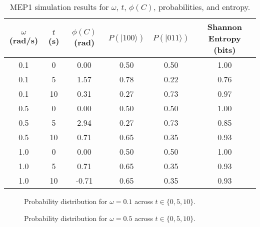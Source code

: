 \documentclass[a4paper,12pt]{article}
\begin{document}
\begin{table}[h]
\centering
\caption{MEP1 simulation results for $\omega$, $t$, $\phi(C)$, probabilities, and entropy.}
\label{tab:results}
\begin{tabular}{cccccc}
\toprule
$\omega$ (rad/s) & $t$ (s) & $\phi(C)$ (rad) & $P(|100\rangle)$ & $P(|011\rangle)$ & Shannon Entropy (bits) \\
\midrule
0.1 & 0 & 0.00 & 0.50 & 0.50 & 1.00 \\
0.1 & 5 & 1.57 & 0.78 & 0.22 & 0.76 \\
0.1 & 10 & 0.31 & 0.27 & 0.73 & 0.97 \\
0.5 & 0 & 0.00 & 0.50 & 0.50 & 1.00 \\
0.5 & 5 & 2.94 & 0.27 & 0.73 & 0.85 \\
0.5 & 10 & 0.71 & 0.65 & 0.35 & 0.93 \\
1.0 & 0 & 0.00 & 0.50 & 0.50 & 1.00 \\
1.0 & 5 & 0.71 & 0.65 & 0.35 & 0.93 \\
1.0 & 10 & -0.71 & 0.65 & 0.35 & 0.93 \\
\bottomrule
\end{tabular}
\end{table}

\begin{figure}[h]
\centering
{}
\caption{Probability distribution for $\omega = 0.1$ across $t \in \{0, 5, 10\}$.}
\label{fig:hist_0.1}
\end{figure}

\begin{figure}[h]
\centering
{}
\caption{Probability distribution for $\omega = 0.5$ across $t \in \{0, 5, 10\}$.}
\label{fig:hist_0.5}
\end{figure}
\end{document}
